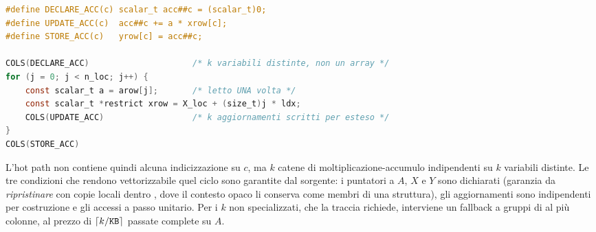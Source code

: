 \begin{lstlisting}[language=C,caption={Generazione delle specializzazioni su
$k$ (estratto di \file{src/kernel/scheme\_a.c}).}]
#define DECLARE_ACC(c) scalar_t acc##c = (scalar_t)0;
#define UPDATE_ACC(c)  acc##c += a * xrow[c];
#define STORE_ACC(c)   yrow[c] = acc##c;

COLS(DECLARE_ACC)                     /* k variabili distinte, non un array */
for (j = 0; j < n_loc; j++) {
    const scalar_t a = arow[j];       /* letto UNA volta */
    const scalar_t *restrict xrow = X_loc + (size_t)j * ldx;
    COLS(UPDATE_ACC)                  /* k aggiornamenti scritti per esteso */
}
COLS(STORE_ACC)
\end{lstlisting}

L'hot path non contiene quindi alcuna indicizzazione su $c$, ma $k$ catene di
moltiplicazione-accumulo indipendenti su $k$ variabili distinte. Le tre
condizioni che rendono vettorizzabile quel ciclo sono garantite dal sorgente: i
puntatori a $A$, $X$ e $Y$ sono dichiarati  (garanzia da
\emph{ripristinare} con copie locali dentro , dove il
contesto opaco li conserva come membri di una struttura), gli aggiornamenti
sono indipendenti per costruzione e gli accessi a passo unitario. Per i $k$ non
specializzati, che la traccia richiede, interviene un fallback a gruppi di al
più  colonne, al prezzo di $\lceil k/\texttt{KB} \rceil$ passate
complete su $A$.
